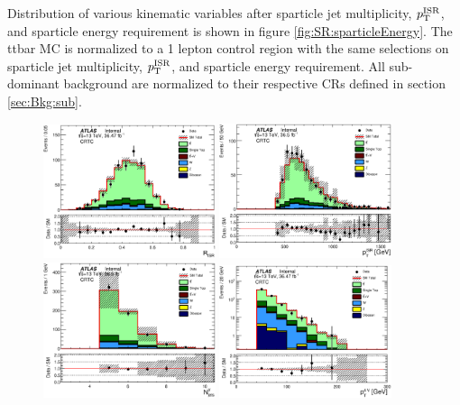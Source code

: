 \indent Distribution of various kinematic variables after sparticle jet multiplicity, $p_{\mathrm{T}}^{\mathrm{ISR}}$, and sparticle energy requirement is shown in figure \ref{fig:SR:sparticleEnergy}.  The ttbar MC is normalized to a 1 lepton control region with the same selections on sparticle jet multiplicity, $p_{\mathrm{T}}^{\mathrm{ISR}}$, and sparticle energy requirement.  All sub-dominant background are normalized to their respective CRs defined in section \ref{sec:Bkg:sub}.\\
\begin{figure}[htbp]
  \begin{center}
    \includegraphics[width=0.45\textwidth]{figures/ttbar/postfit/CA_RISR_CRTopC}
    \includegraphics[width=0.45\textwidth]{figures/ttbar/postfit/CA_pTISR_CRTopC}
    \includegraphics[width=0.45\textwidth]{figures/ttbar/postfit/CA_NjV_CRTopC}
    \includegraphics[width=0.45\textwidth]{figures/ttbar/postfit/CA_pTjV4_CRTopC_log}

\end{center}
\end{figure}
